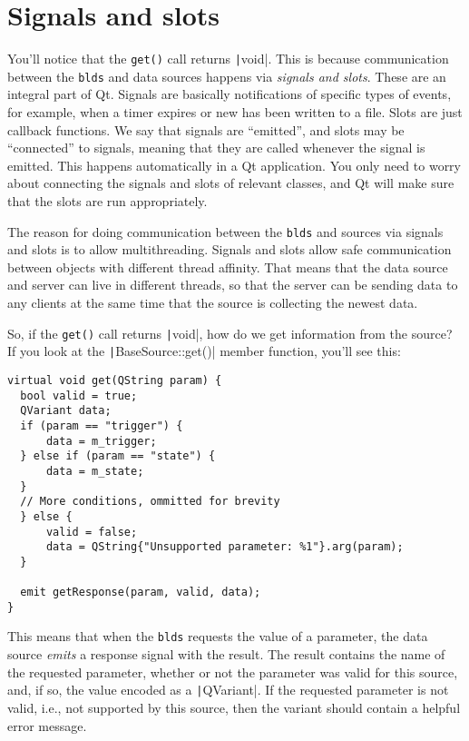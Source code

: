 \documentclass[12pt]{article}
\begin{document}
\section*{Signals and slots}

You'll notice that the \texttt{get()} call returns \texttt|void|.
This is because communication between the \texttt{blds} and data sources happens
via \textit{signals and slots}. These are an integral part of Qt. Signals are
basically notifications of specific types of events, for example, when a timer
expires or new has been written to a file. Slots are just callback
functions. We say that signals are ``emitted'', and slots may be ``connected'' to signals,
meaning that they are called whenever the signal is emitted. This happens
automatically in a Qt application. You only need to worry about connecting
the signals and slots of relevant classes, and Qt will make sure that the slots
are run appropriately.

The reason for doing communication between the \texttt{blds} and sources via
signals and slots is to allow multithreading. Signals and slots allow safe communication
between objects with different thread affinity. That means that the data source
and server can live in different threads, so that the server can be sending data
to any clients at the same time that the source is collecting the newest data.

So, if the \texttt{get()} call returns \texttt|void|, 
how do we get information from the source? If you look at the
\texttt|BaseSource::get()| member function, you'll see this:

\begin{verbatim}
virtual void get(QString param) {
  bool valid = true;
  QVariant data;
  if (param == "trigger") {
      data = m_trigger;
  } else if (param == "state") {
      data = m_state;
  }
  // More conditions, ommitted for brevity
  } else {
      valid = false;
      data = QString{"Unsupported parameter: %1"}.arg(param);
  }
  
  emit getResponse(param, valid, data);
}
\end{verbatim}

This means that when the \texttt{blds} requests the value of a parameter,
the data source \textit{emits} a response signal with the result. The result
contains the name of the requested parameter, whether or not the parameter
was valid for this source, and, if so, the value encoded as a \texttt|QVariant|.
If the requested parameter is not valid, i.e., not supported by this
source, then the variant should contain a helpful error message.
\end{document}
